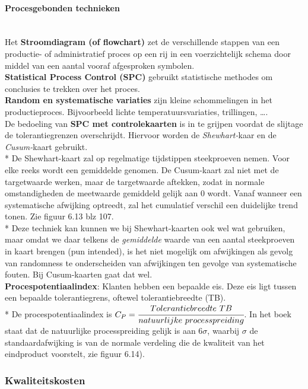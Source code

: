 \documentclass[12pt]{article}
\begin{document}
\paragraph{Procesgebonden technieken}\mbox{}\\
Het \textbf{Stroomdiagram (of flowchart)} zet de verschillende stappen van een productie- of administratief proces op een rij in een voerzichtelijk schema door middel van een aantal vooraf afgesproken symbolen.\\
\textbf{Statistical Process Control (SPC)} gebruikt statistische methodes om conclusies te trekken over het proces.\\
\textbf{Random en systematische variaties} zijn kleine schommelingen in het productieproces. Bijvoorbeeld lichte temperatuursvariaties, trillingen, \dots.\\
De bedoeling van \textbf{SPC met controlekaarten} is in te grijpen voordat de slijtage de tolerantiegrenzen overschrijdt. Hiervoor worden de \textit{Shewhart-}kaar en de \textit{Cusum-}kaart gebruikt.\\*
De Shewhart-kaart zal op regelmatige tijdstippen steekproeven nemen. Voor elke reeks wordt een gemiddelde genomen. De Cusum-kaart zal niet met de targetwaarde werken, maar de targetwaarde aftekken, zodat in normale omstandigheden de meetwaarde gemiddeld gelijk aan $0$ wordt. Vanaf wanneer een systematische afwijking optreedt, zal het cumulatief verschil een duidelijke trend tonen. Zie figuur 6.13 blz 107.\\*
Deze techniek kan kunnen we bij Shewhart-kaarten ook wel wat gebruiken, maar omdat we daar telkens de \textit{gemiddelde} waarde van een aantal steekproeven in kaart brengen (pun intended), is het niet mogelijk om afwijkingen als gevolg van randomness te onderscheiden van afwijkingen ten gevolge van systematische fouten. Bij Cusum-kaarten gaat dat wel.\\
\textbf{Procespotentiaalindex}: Klanten hebben een bepaalde eis. Deze eis ligt tussen een bepaalde tolerantiegrens, oftewel tolerantiebreedte (TB).\\*
De procespotentiaalindex is $C_P = \cfrac{Tolerantiebreedte\ TB}{natuurlijke\ processpreiding}$. In het boek staat dat de natuurlijke processpreiding gelijk is aan $6 \sigma$, waarbij $\sigma$ de standaardafwijking is van de normale verdeling die de kwaliteit van het eindproduct voorstelt, zie figuur 6.14).
\subsubsection{Kwaliteitskosten}
\end{document}
